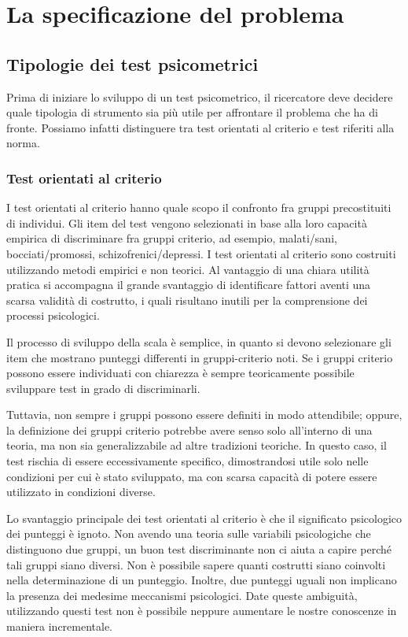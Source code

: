 \chapter{La specificazione del problema}
\label{ch:problema}


\section{Tipologie dei test psicometrici}

Prima di iniziare lo sviluppo di un test psicometrico, il ricercatore deve decidere quale tipologia di strumento sia più utile per affrontare il problema che ha di fronte. Possiamo infatti distinguere tra test orientati al criterio e test riferiti alla norma. 

\subsection{Test orientati al criterio} 

I test orientati al criterio hanno quale scopo il confronto fra gruppi precostituiti di individui. Gli item del test vengono selezionati in base alla loro capacità empirica di discriminare fra gruppi criterio, ad esempio, malati/sani, bocciati/promossi, schizofrenici/depressi. I test orientati al criterio sono costruiti utilizzando metodi empirici e non teorici. Al vantaggio di una chiara utilità pratica si accompagna il grande svantaggio di identificare fattori aventi una scarsa validità di costrutto, i quali risultano inutili per la comprensione dei processi psicologici. 

Il processo di sviluppo della scala è semplice, in quanto si devono selezionare gli item che mostrano punteggi differenti in gruppi-criterio noti. Se i gruppi criterio possono essere individuati con chiarezza è sempre teoricamente possibile sviluppare test in grado di discriminarli.

Tuttavia, non sempre i gruppi possono essere definiti in modo attendibile; oppure, la definizione dei gruppi criterio potrebbe avere senso solo all'interno di una teoria, ma non sia generalizzabile ad altre tradizioni teoriche. In questo caso, il test rischia di essere eccessivamente specifico, dimostrandosi utile solo nelle condizioni per cui è stato sviluppato, ma con scarsa capacità di potere essere utilizzato in condizioni diverse. 

Lo svantaggio principale dei test orientati al criterio è che il significato psicologico dei punteggi è ignoto. Non avendo una teoria sulle variabili psicologiche che
distinguono due gruppi, un buon test
discriminante non ci aiuta a capire perché tali gruppi siano diversi. Non è possibile sapere quanti costrutti siano coinvolti nella
determinazione di un punteggio. Inoltre, due punteggi uguali non implicano la presenza dei medesime meccanismi psicologici. Date queste ambiguità, utilizzando questi test non è possibile neppure aumentare le nostre conoscenze in maniera incrementale.

